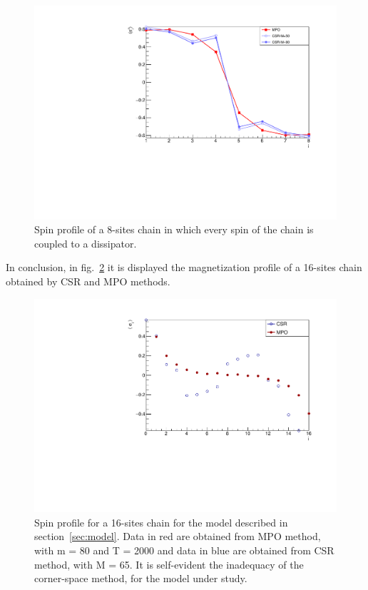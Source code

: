 \begin{figure}[H]
    \centering
    \includegraphics[scale=0.7]{Figures/8sites/8sites_MPOvsCORNER_4U4D.pdf}
    \captionsetup{width=1.\linewidth}
    \caption{Spin profile of a 8-sites chain in which every spin of the chain is coupled to a dissipator.}
    \label{fig:8sites_MPOvsCORNER_4U4D}
\end{figure}

In conclusion, in fig.~\ref{fig:LMComparison16s1051} it is displayed the magnetization profile of a 16-sites chain obtained by CSR and MPO methods.

\begin{figure}[H]
    \centering
    \includegraphics[scale=0.7]{Figures/16sites/LMComparison16s1051.pdf}
    \captionsetup{width=1.\linewidth}
    \caption{Spin profile for a 16-sites chain for the model described in section~\ref{sec:model}. Data in red are obtained from MPO method, with m = 80 and T = 2000 and data in blue are obtained from CSR method, with M = 65. It is self-evident the inadequacy of the corner-space method, for the model under study.}
    \label{fig:LMComparison16s1051}
\end{figure}

